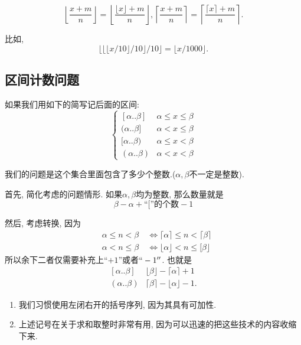 \documentclass{ctexart}
\begin{document}
\begin{corollary}
    $$
\left\lfloor\frac{x+m}{n}\right\rfloor=\left\lfloor\frac{\lfloor x\rfloor+m}{n}\right\rfloor,\left\lceil\frac{x+m}{n}\right\rceil=\left\lceil\frac{\lceil x\rceil+m}{n}\right\rceil .
$$
    
\end{corollary}

比如, $$
\lfloor\lfloor\lfloor x / 10\rfloor / 10\rfloor / 10\rfloor=\lfloor x / 1000\rfloor .
$$

\subsection{区间计数问题} 

如果我们用如下的简写记后面的区间:
$$
\begin{cases}
    [\alpha..\beta] & \alpha \leqslant x \leqslant \beta\\
    (\alpha..\beta]& \alpha<x \leqslant \beta \\
    [\alpha..\beta) & \alpha \leq x<\beta\\
    (\alpha..\beta)& \alpha<x<\beta
\end{cases}$$

我们的问题是这个集合里面包含了多少个整数.($\alpha,\beta$不一定是整数). 

首先, 简化考虑的问题情形. 如果$\alpha,\beta$均为整数, 那么数量就是
\[
    \beta-\alpha+\text{``[''的个数}-1
\]

然后, 考虑转换, 因为
$$
\begin{aligned}
& \alpha \leqslant n<\beta \quad \Leftrightarrow\lceil\alpha\rceil \leqslant n<\lceil\beta\rceil \\
& \alpha<n \leqslant \beta \quad \Leftrightarrow\lfloor\alpha\rfloor<n \leqslant[\beta\rfloor
\end{aligned}
$$
所以余下二者仅需要补充上``$+1$''或者$``-1''$. 也就是
$$
\begin{array}{ll}
{[\alpha .. \beta]} & \lfloor\beta\rfloor-\lceil \alpha\rceil+1 \\
(\alpha . . \beta) & \lceil\beta \rceil-\lfloor\alpha\rfloor-1 .
\end{array}
$$
\begin{remark}
    \begin{enumerate}
        \item 我们习惯使用左闭右开的括号序列, 因为其具有可加性.
        \item 上述记号在关于求和取整时非常有用, 因为可以迅速的把这些技术的内容收缩下来. 
    \end{enumerate}
    
\end{remark}
\end{document}
